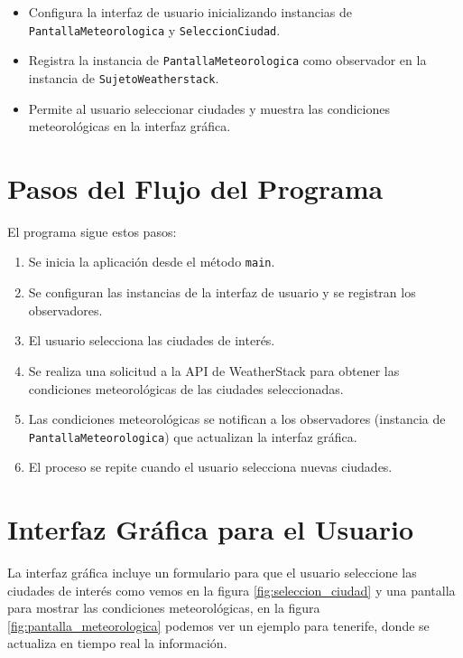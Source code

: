 \documentclass{article}
\begin{document}
\begin{itemize}
    \item Configura la interfaz de usuario inicializando instancias de \texttt{PantallaMeteorologica} y \texttt{SeleccionCiudad}.
    \item Registra la instancia de \texttt{PantallaMeteorologica} como observador en la instancia de \texttt{SujetoWeatherstack}.
    \item Permite al usuario seleccionar ciudades y muestra las condiciones meteorológicas en la interfaz gráfica.
\end{itemize}

\section{Pasos del Flujo del Programa}
El programa sigue estos pasos:

\begin{enumerate}
    \item Se inicia la aplicación desde el método \texttt{main}.
    \item Se configuran las instancias de la interfaz de usuario y se registran los observadores.
    \item El usuario selecciona las ciudades de interés.
    \item Se realiza una solicitud a la API de WeatherStack para obtener las condiciones meteorológicas de las ciudades seleccionadas.
    \item Las condiciones meteorológicas se notifican a los observadores (instancia de \texttt{PantallaMeteorologica}) que actualizan la interfaz gráfica.
    \item El proceso se repite cuando el usuario selecciona nuevas ciudades.
\end{enumerate}

\section{Interfaz Gráfica para el Usuario}
La interfaz gráfica incluye un formulario para que el usuario seleccione las ciudades de interés como vemos en la figura \ref{fig:seleccion_ciudad} y una pantalla para mostrar las condiciones meteorológicas, en la figura \ref{fig:pantalla_meteorologica} podemos ver un ejemplo para tenerife, donde se actualiza en tiempo real la información.
\end{document}
